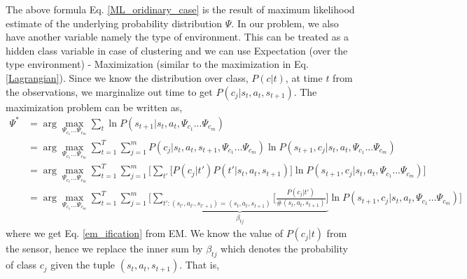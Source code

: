 \documentclass{article}[11pt]
\begin{document}
The above formula Eq. \ref{ML_oridinary_case} is the result of maximum likelihood estimate of the underlying probability distribution $\Psi$. In our problem, we also have another variable namely the type of environment. This can be treated as a hidden class variable in case of clustering and we can use Expectation (over the type environment) - Maximization (similar to the maximization in Eq. \ref{Lagrangian}). Since we know the distribution over class, $P(c|t)$, at time $t$  from the observations, we marginalize out time to get $P(c_j|s_t,a_t,s_{t+1})$. The maximization problem can be written as,
 \begin{align}
\Psi^* &= \arg \max_{\Psi_{c_1} ... \Psi_{c_m}} \sum_t \ln P(s_{t+1}|s_t,a_t,\Psi_{c_1} ... \Psi_{c_m})\\
\label{em_ification}
&=\arg \max_{\Psi_{c_1} ... \Psi_{c_m}} \sum_{t=1}^T\sum_{j=1}^m P(c_j|s_t,a_t,s_{t+1},\Psi_{c_1} ... \Psi_{c_m})\ln P(s_{t+1}, c_j|s_t,a_t,\Psi_{c_1} ... \Psi_{c_m})\\
&=\arg \max_{\Psi_{c_1} ... \Psi_{c_m}} \sum_{t=1}^T\sum_{j=1}^m \Big[\sum_{t'}\big[P(c_j|t')P(t'|s_t,a_t,s_{t+1})\big]\ln P(s_{t+1}, c_j|s_t,a_t,\Psi_{c_1} ... \Psi_{c_m})\Big]\\
&=\arg \max_{\Psi_{c_1} ... \Psi_{c_m}} \sum_{t=1}^T\sum_{j=1}^m\Big[ \underbrace{\sum_{t':(s_{t'},a_{t'},s_{t'+1}) = (s_t,a_t,s_{t+1})}\Bigg[\frac{P(c_j|t')}{\#(s_t,a_t,s_{t+1})}\Bigg]}_{\beta_{tj}}\ln P(s_{t+1}, c_j|s_t,a_t,\Psi_{c_1} ... \Psi_{c_m})\Big]
 \end{align} where we get Eq. \ref{em_ification} from EM.  We know the value of $P(c_j|t)$ from the sensor, hence we replace the inner sum by $\beta_{tj}$ which denotes the probability of class $c_j$ given the tuple $(s_t,a_t,s_{t+1})$. That is, 
 
\end{document}
